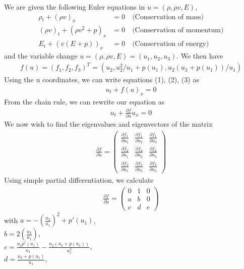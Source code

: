 We are given the following Euler equations in $u=(\rho, \rho v, E)$, 
\begin{align}
	\rho_t + (\rho v)_x &= 0 \quad  \text{(Conservation of mass)} \\
	(\rho v)_t +(\rho v^2 + p)_x &= 0 \quad \text{(Conservation of momentum)} \\
	E_t + (v(E+p))_x &= 0 \quad \text{(Conservation of energy)}
\end{align}
and the variable change $u = (\rho, \rho v, E) = (u_1, u_2, u_3)$. We then have 
\begin{align*}
	f(u) = (f_1, f_2, f_3)^T = (u_2, u_2^2/u_1 + p(u_1), u_2(u_3+p(u_1))/u_1)
\end{align*}
Using the u coordinates, we can write equations (1), (2), (3) as
\begin{align*}
	u_t + f(u)_x = 0
\end{align*}
From the chain rule, we can rewrite our equation as  
\begin{align}
	u_t + \frac{\partial f}{\partial u} u_x = 0
\end{align}
We now wish to find the eigenvalues and eigenvectors of the matrix 
\begin{align*}
	\frac{\partial f}{\partial u} = \begin{pmatrix}
	\frac{\partial f_1}{\partial u_1} & \frac{\partial f_1}{\partial u_2} & \frac{\partial f_1}{\partial u_3} \\
	\frac{\partial f_2}{\partial u_1} & \frac{\partial f_2}{\partial u_2} & \frac{\partial f_2}{\partial u_3} \\
	\frac{\partial f_3}{\partial u_1} & \frac{\partial f_3}{\partial u_2} & \frac{\partial f_3}{\partial u_3}
	\end{pmatrix}
\end{align*} 
Using simple partial differentiation, we calculate 
\begin{align*}
	\frac{\partial f}{\partial u} = \begin{pmatrix}
	0 & 1 & 0 \\ 
	a & b & 0 \\ 
	c & d & e
	\end{pmatrix}
\end{align*}
with $a=-(\frac{u_2}{u_1})^2 + p'(u_1)$, \\
 $b=2(\frac{u_2}{u_1})$, \\
 $c=\frac{u_2 p'(u_1)}{u_1} - \frac{u_2(u_3 + p(u_1))}{u_1^2}$, \\
 $d = \frac{u_3 + p(u_1)}{u_1}$, \\
